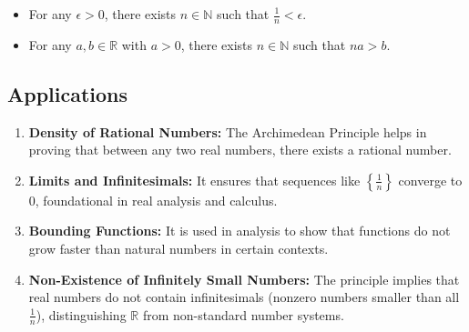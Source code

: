 \begin{itemize}
  \item For any \( \epsilon > 0 \), there exists \( n \in \mathbb{N} \) such that \( \frac{1}{n} < \epsilon \).
  \item For any \( a, b \in \mathbb{R} \) with \( a > 0 \), there exists \( n \in \mathbb{N} \) such that \( na > b \).
\end{itemize}

\subsection{Applications}

\begin{enumerate}
  \item \textbf{Density of Rational Numbers:} The Archimedean Principle helps in proving that between any two real numbers, there exists a rational number.
  
  \item \textbf{Limits and Infinitesimals:} It ensures that sequences like \( \left\{ \frac{1}{n} \right\} \) converge to 0, foundational in real analysis and calculus.
  
  \item \textbf{Bounding Functions:} It is used in analysis to show that functions do not grow faster than natural numbers in certain contexts.
  
  \item \textbf{Non-Existence of Infinitely Small Numbers:} The principle implies that real numbers do not contain infinitesimals (nonzero numbers smaller than all \( \frac{1}{n} \)), distinguishing \( \mathbb{R} \) from non-standard number systems.
\end{enumerate}

\newpage
